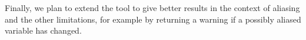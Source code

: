 \documentclass[a4paper]{llncs}
\newcommand{\jml}{\textsc{Jml}}
\begin{document}

Finally, we plan to extend the tool to give better results in the
context of aliasing and the other limitations, for example by
returning a warning if a possibly aliased variable has changed.



\end{document}
